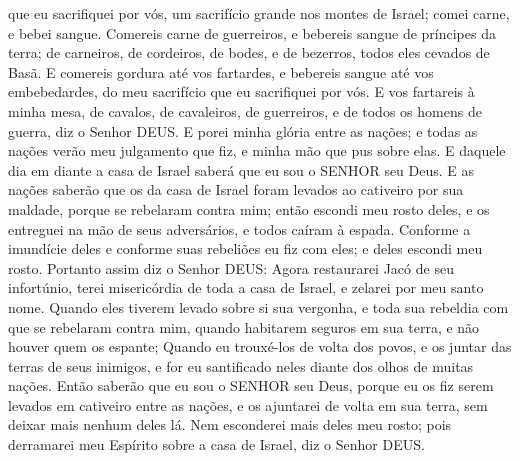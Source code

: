 { que eu sacrifiquei por vós, um sacrifício grande nos montes de Israel; comei carne, e bebei sangue.
Comereis carne de guerreiros, e bebereis sangue de príncipes da terra; de carneiros, de cordeiros, de bodes, e de bezerros, todos eles cevados de Basã.
E comereis gordura até vos fartardes, e bebereis sangue até vos embebedardes, do meu sacrifício que eu sacrifiquei por vós.
E vos fartareis à minha mesa, de cavalos, de cavaleiros, de guerreiros, e de todos os homens de guerra, diz o Senhor DEUS.
E porei minha glória entre as nações; e todas as nações verão meu julgamento que fiz, e minha mão que pus sobre elas.
E daquele dia em diante a casa de Israel saberá que eu sou o SENHOR seu Deus.
E as nações saberão que os da casa de Israel foram levados ao cativeiro por sua
{} maldade, porque se rebelaram contra mim; então escondi meu rosto deles, e os entreguei na mão de seus adversários, e todos caíram à espada.
Conforme a imundície deles e conforme suas rebeliões eu fiz com eles; e deles escondi meu rosto.
Portanto assim diz o Senhor DEUS: Agora restaurarei Jacó de seu infortúnio, terei misericórdia de toda a casa de Israel, e zelarei por meu santo nome.
Quando eles tiverem levado sobre si sua vergonha, e toda sua rebeldia com que se rebelaram contra mim, quando habitarem seguros em sua terra, e não houver quem os espante;
Quando eu trouxé-los de volta dos povos, e os juntar das terras de seus inimigos, e for eu santificado neles diante dos olhos de muitas nações.
Então saberão que eu sou o SENHOR seu Deus, porque eu os fiz serem levados em cativeiro entre as nações, e os ajuntarei de volta em sua terra, sem deixar mais nenhum deles lá.
Nem esconderei mais deles meu rosto; pois derramarei
 meu Espírito sobre a casa de Israel, diz o Senhor DEUS.

}
